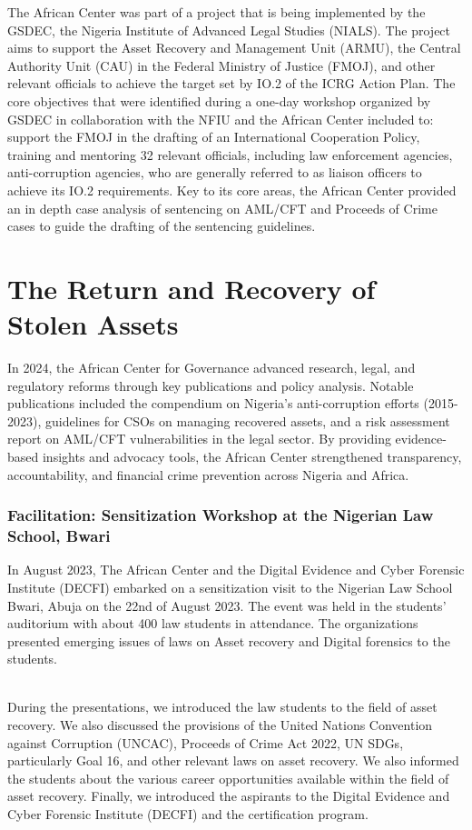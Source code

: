 \documentclass[
  letterpaper,
  DIV=11,
  numbers=noendperiod]{scrreprt}
\begin{document}
The African Center was part of a project that is being implemented by
the GSDEC, the Nigeria Institute of Advanced Legal Studies (NIALS). The
project aims to support the Asset Recovery and Management Unit (ARMU),
the Central Authority Unit (CAU) in the Federal Ministry of Justice
(FMOJ), and other relevant officials to achieve the target set by IO.2
of the ICRG Action Plan. The core objectives that were identified during
a one-day workshop organized by GSDEC in collaboration with the NFIU and
the African Center included to: support the FMOJ in the drafting of an
International Cooperation Policy, training and mentoring 32 relevant
officials, including law enforcement agencies, anti-corruption agencies,
who are generally referred to as liaison officers to achieve its IO.2
requirements. Key to its core areas, the African Center provided an in
depth case analysis of sentencing on AML/CFT and Proceeds of Crime cases
to guide the drafting of the sentencing guidelines.

\chapter{The Return and Recovery of Stolen
Assets}\label{the-return-and-recovery-of-stolen-assets}

In 2024, the African Center for Governance advanced research, legal, and
regulatory reforms through key publications and policy analysis. Notable
publications included the compendium on Nigeria's anti-corruption
efforts (2015-2023), guidelines for CSOs on managing recovered assets,
and a risk assessment report on AML/CFT vulnerabilities in the legal
sector. By providing evidence-based insights and advocacy tools, the
African Center strengthened transparency, accountability, and financial
crime prevention across Nigeria and Africa.

\subsection{Facilitation: Sensitization Workshop at the Nigerian Law
School,
Bwari}\label{facilitation-sensitization-workshop-at-the-nigerian-law-school-bwari}

In August 2023, The African Center and the Digital Evidence and Cyber
Forensic Institute (DECFI) embarked on a sensitization visit to the
Nigerian Law School Bwari, Abuja on the 22nd of August 2023. The event
was held in the students' auditorium with about 400 law students in
attendance. The organizations presented emerging issues of laws on Asset
recovery and Digital forensics to the students.\\
\strut ~\\
During the presentations, we introduced the law students to the field of
asset recovery. We also discussed the provisions of the United Nations
Convention against Corruption (UNCAC), Proceeds of Crime Act 2022, UN
SDGs, particularly Goal 16, and other relevant laws on asset recovery.
We also informed the students about the various career opportunities
available within the field of asset recovery. Finally, we introduced the
aspirants to the Digital Evidence and Cyber Forensic Institute (DECFI)
and the certification program.
\end{document}
